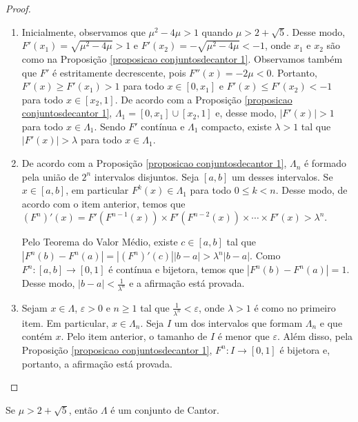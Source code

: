 \begin{proof}
\begin{enumerate}
\item Inicialmente, observamos que $\mu^2 - 4\mu > 1$ quando $\mu > 2 + \sqrt{5}$. Desse modo, $F'(x_1) = \sqrt{\mu^2 - 4\mu} > 1$ e $F'(x_2) = -\sqrt{\mu^2 - 4\mu} < -1$, onde $x_1$ e $x_2$ são como na Proposição \ref{proposicao conjuntosdecantor 1}. Observamos também que $F'$ é estritamente decrescente, pois $F''(x) = -2\mu < 0$.  Portanto, $F'(x) \geq F'(x_1) > 1$ para todo $x \in [0, x_1]$ e $F'(x) \leq F'(x_2) < -1$ para todo $x \in [x_2, 1]$. De acordo com a Proposição \ref{proposicao conjuntosdecantor 1}, $\Lambda_1 = [0, x_1] \cup [x_2, 1]$ e, desse modo, $|F'(x)| > 1$ para todo $x \in \Lambda_1$. Sendo $F'$ contínua e $\Lambda_1$ compacto, existe $\lambda > 1$ tal que $|F'(x)| > \lambda$ para todo $x \in \Lambda_1$.

\item De acordo com a Proposição \ref{proposicao conjuntosdecantor 1}, $\Lambda_n$ é formado pela união de $2^n$ intervalos disjuntos. Seja $[a, b]$ um desses intervalos. Se $x \in [a, b]$, em particular $F^k(x) \in \Lambda_1$ para todo $0 \leq k < n$. Desse modo, de acordo com o item anterior, temos que $(F^n)'(x) = F'(F^{n-1}(x)) \times F'(F^{n-2}(x)) \times \cdots \times F'(x) > \lambda^n$.

Pelo Teorema do Valor Médio, existe $c \in [a, b]$ tal que $|F^n(b) - F^n(a)| = |(F^n)'(c)||b - a| > \lambda^n|b - a|$. Como $F^n: [a, b] \to [0 ,1]$ é contínua e bijetora, temos que $|F^n(b) - F^n(a)| = 1$. Desse modo, $|b - a| < \frac{1}{\lambda^n}$ e a afirmação está provada.

\item  Sejam $x \in \Lambda$, $\varepsilon > 0$ e $n \geq 1$ tal que $\frac{1}{\lambda^n} < \varepsilon$, onde $\lambda > 1$ é como no primeiro item. Em particular, $x \in \Lambda_n$. Seja $I$ um dos intervalos que formam $\Lambda_n$ e que contém $x$. Pelo item anterior, o tamanho de $I$ é menor que $\varepsilon$. Além disso, pela Proposição \ref{proposicao conjuntosdecantor 1}, $F^n: I \to [0,1]$ é bijetora e, portanto, a afirmação está provada.
\end{enumerate}
\end{proof} 

\begin{theorem}
\label{teorema conjuntosdecantor 1}
Se $\mu > 2 + \sqrt{5}$, então $\Lambda$ é um conjunto de Cantor.
\end{theorem}

